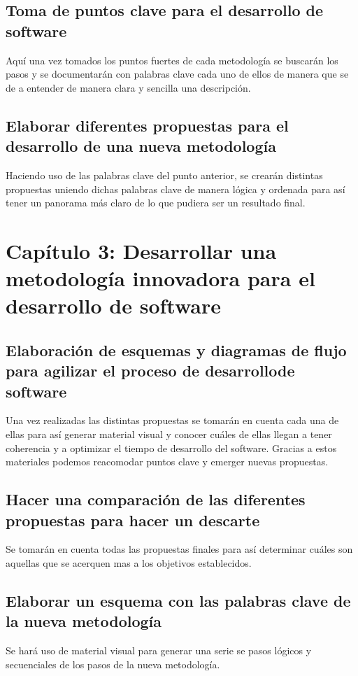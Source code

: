 	\subsection{Toma de puntos clave para el desarrollo de software}
		Aquí una vez tomados los puntos fuertes de cada metodología se buscarán los pasos y se documentarán con palabras clave cada uno de ellos de manera que se de a entender de manera clara y sencilla una descripción.
		
	\subsection{Elaborar diferentes propuestas para el desarrollo de una nueva metodología}
		Haciendo uso de las palabras clave del punto anterior, se crearán distintas propuestas uniendo dichas palabras clave de manera lógica y ordenada para así tener un panorama más claro de lo que pudiera ser un resultado final.
		
\section{\textbf{Capítulo 3:} Desarrollar una metodología innovadora para el desarrollo de software}

	\subsection{Elaboración de esquemas y diagramas de flujo para agilizar el proceso de desarrollode software}
	
		Una vez realizadas las distintas propuestas se tomarán en cuenta cada una de ellas para así generar material visual y conocer cuáles de ellas llegan a tener coherencia y a optimizar el tiempo de desarrollo del software. Gracias a estos materiales podemos reacomodar puntos clave y emerger nuevas propuestas.
	
	\subsection{Hacer una comparación de las diferentes propuestas para hacer un descarte}
		Se tomarán en cuenta todas las propuestas finales para así determinar cuáles son aquellas que se acerquen mas a los objetivos establecidos.
		
	\subsection{Elaborar un esquema con las palabras clave de la nueva metodología}	
		Se hará uso de material visual para generar una serie se pasos lógicos y secuenciales de los pasos de la nueva metodología.
		
